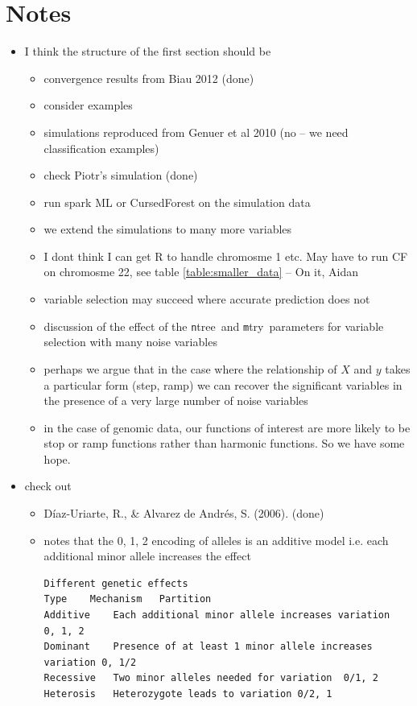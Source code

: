 \documentclass[10pt,letterpaper]{article}
\newcommand{\mtry}{{\texttt mtry}}
\newcommand{\ntree}{{\texttt ntree}}
\begin{document}
\section{Notes}
\begin{itemize}
\item I think the structure of the first section should be
  \begin{itemize}
  \item convergence results from Biau 2012  (done)
  \item consider  \cite{Segal.2004} examples
  \item simulations reproduced from Genuer et al 2010 (no -- we need classification examples)
  \item check Piotr's simulation  (done)
  \item run spark ML or CursedForest on the  simulation data 
  \item we extend the simulations to many more variables 
  \item I dont think I can get R to handle chromosme 1 etc. May have to run CF on chromosme 22, see table
    \ref{table:smaller_data} -- On it, Aidan
  \item variable  selection may succeed where accurate prediction does not
  \item discussion of the effect of the \ntree\ and \mtry\ parameters for variable selection with many noise variables
  \item   perhaps we argue that in the case where the relationship of $X$ and $y$ takes a particular form (step, ramp) we can recover
    the significant variables in the presence of a very large number of noise variables
  \item in the case of genomic data, our functions of interest are more likely to be stop or ramp functions rather than harmonic
    functions. So we have some hope.
  \end{itemize}
\item check out 
  \begin{itemize}
  \item D\'iaz-Uriarte, R., \& Alvarez de Andr\'es, S. (2006). (done)
  \item \cite{Goldstein.et.al.2011}
notes that the 0, 1, 2 encoding of alleles is an additive model i.e. each additional minor allele increases the effect 
\begin{verbatim}
Different genetic effects
Type	Mechanism	Partition
Additive	Each additional minor allele increases variation	0, 1, 2
Dominant	Presence of at least 1 minor allele increases variation	0, 1/2
Recessive	Two minor alleles needed for variation	0/1, 2
Heterosis	Heterozygote leads to variation	0/2, 1
\end{verbatim}


\end{itemize}
\end{itemize}
\end{document}
